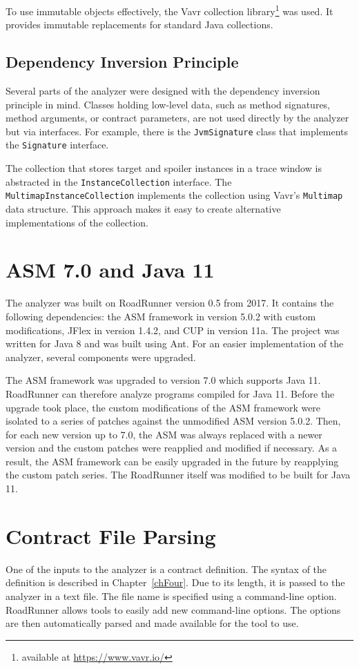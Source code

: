 To use immutable objects effectively, the Vavr collection
library\footnote{available at \url{https://www.vavr.io/}} was used. It provides
immutable replacements for standard Java collections.

\subsection{Dependency Inversion Principle}
Several parts of the analyzer were designed with the dependency inversion
principle in mind. Classes holding low-level data, such as method signatures,
method arguments, or contract parameters, are not used directly by the analyzer
but via interfaces. For example, there is the \texttt{JvmSignature} class that
implements the \texttt{Signature} interface.

The collection that stores target and spoiler instances in a trace window is
abstracted in the \texttt{InstanceCollection} interface. The
\texttt{MultimapInstanceCollection} implements the collection using Vavr's
\texttt{Multimap} data structure. This approach makes it easy to create
alternative implementations of the collection.

\section{ASM 7.0 and Java 11}
\label{asmAndJava}
The analyzer was built on RoadRunner version 0.5 from 2017. It contains the
following dependencies: the ASM framework in version 5.0.2 with custom
modifications, JFlex in version 1.4.2, and CUP in version 11a. The project was
written for Java 8 and was built using Ant. For an easier implementation of the
analyzer, several components were upgraded.

The ASM framework was upgraded to version 7.0 which supports Java 11. RoadRunner
can therefore analyze programs compiled for Java 11. Before the upgrade took
place, the custom modifications of the ASM framework were isolated to a series
of patches against the unmodified ASM version 5.0.2. Then, for each new version
up to 7.0, the ASM was always replaced with a newer version and the custom
patches were reapplied and modified if necessary. As a result, the ASM framework
can be easily upgraded in the future by reapplying the custom patch series. The
RoadRunner itself was modified to be built for Java 11.

\section{Contract File Parsing}
\label{cfParsing}
One of the inputs to the analyzer is a contract definition. The syntax of the
definition is described in Chapter~\ref{chFour}. Due to its length, it is passed
to the analyzer in a text file. The file name is specified using a command-line
option. RoadRunner allows tools to easily add new command-line options. The
options are then automatically parsed and made available for the tool to use.

